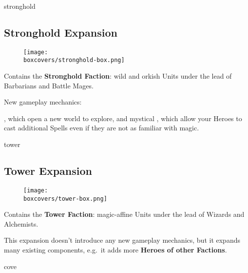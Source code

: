 \begin{multicols}{2}
\begin{expansion}[title=]{stronghold}
    \subsection*{\color{stronghold}Stronghold Expansion}
    \setlength\intextsep{0pt}
    \setlength\columnsep{0.8em}
    \begin{wrapfigure}{l}{0.35\textwidth}
        \texttt{[image: \\boxcovers/stronghold-box.png]}
    \end{wrapfigure}
    Contains the \textbf{Stronghold Faction}: wild and orkish Units under the lead of Barbarians and Battle Mages.\par
    \medskip
    New gameplay mechanics:\par
    \smallskip
    , which open a new world to explore, and mystical ,
    which allow your Heroes to cast additional Spells even if they are not as familiar with magic.
\end{expansion}

\vspace*{1em}
\begin{expansion}[title=]{tower}
    \subsection*{\color{tower}Tower Expansion}
    \setlength\intextsep{0pt}
    \setlength\columnsep{0.8em}
    \begin{wrapfigure}{l}{0.35\textwidth}
        \texttt{[image: \\boxcovers/tower-box.png]}
    \end{wrapfigure}
    Contains the \textbf{Tower Faction}: magic-affine Units under the lead of Wizards and Alchemists.\par
    \medskip
    This expansion doesn't introduce any new gameplay mechanics, but it expands many existing components, e.g.~it adds more \textbf{Heroes of other Factions}.
\end{expansion}
\vspace*{\fill}
\columnbreak

\begin{expansion}[title=]{cove}

\end{expansion}
\end{multicols}
